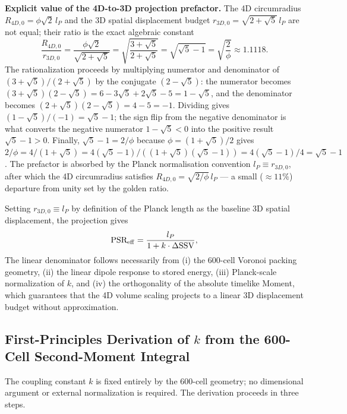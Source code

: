 \documentclass[11pt,letterpaper]{article}
\begin{document}
\textbf{Explicit value of the 4D-to-3D projection prefactor.}
The 4D circumradius $R_{4D,0} = \phi\sqrt{2}\,l_P$ and the 3D
spatial displacement budget $r_{3D,0} = \sqrt{2+\sqrt{5}}\,l_P$
are not equal; their ratio is the exact algebraic constant
\begin{equation}
  \frac{R_{4D,0}}{r_{3D,0}}
  = \frac{\phi\sqrt{2}}{\sqrt{2+\sqrt{5}}}
  = \sqrt{\frac{3+\sqrt{5}}{2+\sqrt{5}}}
  = \sqrt{\sqrt{5}-1}
  = \sqrt{\frac{2}{\phi}}
  \approx 1.1118.
  \label{eq:4D3D_prefactor}
\end{equation}
The rationalization proceeds by multiplying numerator and denominator of 
$(3+\sqrt{5})/(2+\sqrt{5})$ by the conjugate $(2-\sqrt{5})$:
the numerator becomes $(3+\sqrt{5})(2-\sqrt{5}) = 6 - 3\sqrt{5} + 2\sqrt{5} - 5 
= 1 - \sqrt{5}$, and the denominator becomes 
$(2+\sqrt{5})(2-\sqrt{5}) = 4 - 5 = -1$. Dividing gives 
$(1-\sqrt{5})/(-1) = \sqrt{5}-1$; the sign flip from the negative 
denominator is what converts the negative numerator $1-\sqrt{5} < 0$ 
into the positive result $\sqrt{5}-1 > 0$. Finally, 
$\sqrt{5}-1 = 2/\phi$ because $\phi = (1+\sqrt{5})/2$ gives 
$2/\phi = 4/(1+\sqrt{5}) = 4(\sqrt{5}-1)/((1+\sqrt{5})(\sqrt{5}-1)) 
= 4(\sqrt{5}-1)/4 = \sqrt{5}-1$.
The prefactor is absorbed by the Planck normalisation convention
$l_P \equiv r_{3D,0}$, after which the 4D circumradius satisfies
$R_{4D,0} = \sqrt{2/\phi}\,l_P$ — a small (${\approx}11\%$) departure
from unity set by the golden ratio.


Setting 
$r_{3D,0} \equiv l_P$ by definition of the Planck length as the 
baseline 3D spatial displacement, the projection gives
\begin{equation}
\text{PSR}_{\rm eff} = \frac{l_P}{1 + k \cdot \Delta\text{SSV}},
\label{eq:psr_derived}
\end{equation}
The linear denominator follows necessarily from (i) the 600-cell Voronoi 
packing geometry, (ii) the linear dipole response to stored energy, (iii) 
Planck-scale normalization of $k$, and (iv) the orthogonality of the absolute 
timelike Moment, which guarantees that the 4D volume scaling projects to a 
linear 3D displacement budget without approximation.

\subsection{First-Principles Derivation of $k$ from the 600-Cell Second-Moment Integral}

The coupling constant $k$ is fixed entirely by the 600-cell geometry; no 
dimensional argument or external normalization is required. The derivation 
proceeds in three steps.
\end{document}
